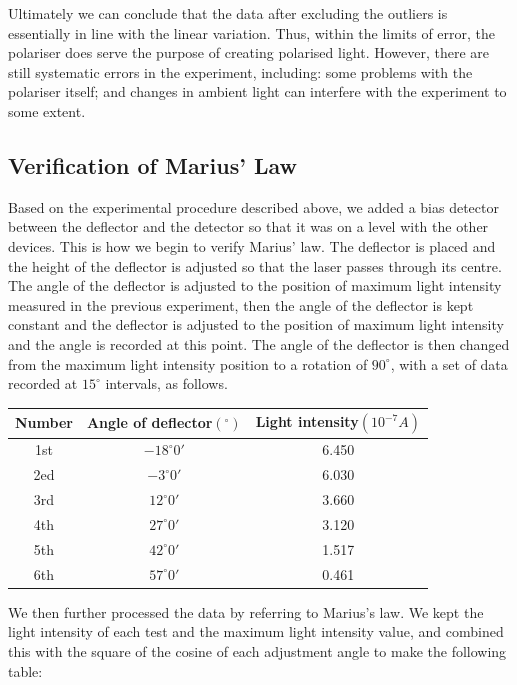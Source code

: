 \documentclass[UTF8]{article}
\begin{document}
    Ultimately we can conclude that the data after excluding the outliers is essentially in line with the linear variation. Thus, within the limits of error, the polariser does serve the purpose of creating polarised light. However, there are still systematic errors in the experiment, including: some problems with the polariser itself; and changes in ambient light can interfere with the experiment to some extent.
    
    \newpage
    \subsection{Verification of Marius' Law}
    
Based on the experimental procedure described above, we added a bias detector between the deflector and the detector so that it was on a level with the other devices. This is how we begin to verify Marius' law. The deflector is placed and the height of the deflector is adjusted so that the laser passes through its centre. The angle of the deflector is adjusted to the position of maximum light intensity measured in the previous experiment, then the angle of the deflector is kept constant and the deflector is adjusted to the position of maximum light intensity and the angle is recorded at this point. The angle of the deflector is then changed from the maximum light intensity position to a rotation of $90^\circ$, with a set of data recorded at $15^\circ$ intervals, as follows.
	\begin{center}
	\begin{tabular}{ccc}
		\toprule
		Number & Angle of deflector$\left ( ^{\circ}  \right ) $ & Light intensity$\left ( 10^{-7}A  \right ) $\\
		\midrule
		1st & $-18^{\circ} {0}' $ & 6.450 \\
		2ed & $-3^{\circ} {0}' $ & 6.030 \\
		3rd & $12^{\circ} {0}' $ & 3.660 \\
		4th & $27^{\circ} {0}' $ & 3.120 \\
		5th & $42^{\circ} {0}' $ & 1.517 \\
		6th & $57^{\circ} {0}' $ & 0.461 \\
		\bottomrule
	\end{tabular}
\end{center}
	
	We then further processed the data by referring to Marius's law. We kept the light intensity of each test and the maximum light intensity value, and combined this with the square of the cosine of each adjustment angle to make the following table:
	
\end{document}
